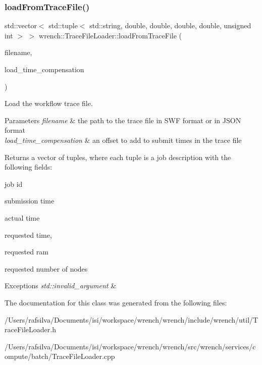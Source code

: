 \subsubsection{\texorpdfstring{load\+From\+Trace\+File()}{loadFromTraceFile()}}
{\footnotesize\ttfamily std\+::vector$<$ std\+::tuple$<$ std\+::string, double, double, double, double, unsigned int $>$ $>$ wrench\+::\+Trace\+File\+Loader\+::load\+From\+Trace\+File (\begin{DoxyParamCaption}\item[{std\+::string}]{filename,  }\item[{double}]{load\+\_\+time\+\_\+compensation }\end{DoxyParamCaption})\hspace{0.3cm}{\ttfamily [static]}}



Load the workflow trace file. 


\begin{DoxyParams}{Parameters}
{\em filename} & the path to the trace file in S\+WF format or in J\+S\+ON format \\
\hline
{\em load\+\_\+time\+\_\+compensation} & an offset to add to submit times in the trace file\\
\hline
\end{DoxyParams}
\begin{DoxyReturn}{Returns}
a vector of tuples, where each tuple is a job description with the following fields\+:
\begin{DoxyItemize}
\item job id
\item submission time
\item actual time
\item requested time,
\item requested ram
\item requested number of nodes
\end{DoxyItemize}
\end{DoxyReturn}

\begin{DoxyExceptions}{Exceptions}
{\em std\+::invalid\+\_\+argument} & \\
\hline
\end{DoxyExceptions}


The documentation for this class was generated from the following files\+:\begin{DoxyCompactItemize}
\item 
/\+Users/rafsilva/\+Documents/isi/workspace/wrench/wrench/include/wrench/util/Trace\+File\+Loader.\+h\item 
/\+Users/rafsilva/\+Documents/isi/workspace/wrench/wrench/src/wrench/services/compute/batch/Trace\+File\+Loader.\+cpp\end{DoxyCompactItemize}
